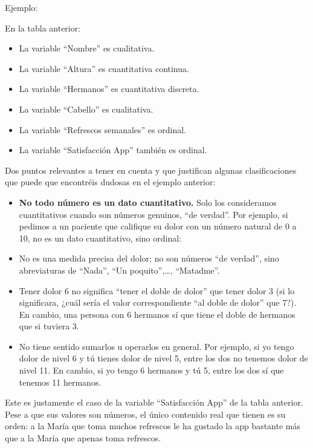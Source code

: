 \documentclass[
  spanish,
  letterpaper,
  DIV=11,
  numbers=noendperiod]{scrreprt}
\providecommand{\tightlist}{%
  \setlength{\itemsep}{0pt}\setlength{\parskip}{0pt}}
\begin{document}
Ejemplo:

En la tabla anterior:

\begin{itemize}
\tightlist
\item
  La variable ``Nombre'' es cualitativa.
\item
  La variable ``Altura'' es cuantitativa continua.
\item
  La variable ``Hermanos'' es cuantitativa discreta.
\item
  La variable ``Cabello'' es cualitativa.
\item
  La variable ``Refrescos semanales'' es ordinal.
\item
  La variable ``Satisfacción App'' también es ordinal.
\end{itemize}

Dos puntos relevantes a tener en cuenta y que justifican algunas
clasificaciones que puede que encontréis dudosas en el ejemplo anterior:

\begin{itemize}
\item
  \textbf{No todo número es un dato cuantitativo.} Solo los consideramos
  cuantitativos cuando son números genuinos, ``de verdad''. Por ejemplo,
  si pedimos a un paciente que califique su dolor con un número natural
  de 0 a 10, no es un dato cuantitativo, sino ordinal:
\item
  No es una medida precisa del dolor; no son números ``de verdad'', sino
  abreviaturas de ``Nada'', ``Un poquito'',\ldots, ``Matadme''.
\item
  Tener dolor 6 no significa ``tener el doble de dolor'' que tener dolor
  3 (si lo significara, ¿cuál sería el valor correspondiente ``al doble
  de dolor'' que 7?). En cambio, una persona con 6 hermanos sí que tiene
  el doble de hermanos que si tuviera 3.
\item
  No tiene sentido sumarlos u operarlos en general. Por ejemplo, si yo
  tengo dolor de nivel 6 y tú tienes dolor de nivel 5, entre los dos no
  tenemos dolor de nivel 11. En cambio, si yo tengo 6 hermanos y tú 5,
  entre los dos sí que tenemos 11 hermanos.
\end{itemize}

Este es justamente el caso de la variable ``Satisfacción App'' de la
tabla anterior. Pese a que sus valores son números, el único contenido
real que tienen es su orden: a la María que toma muchos refrescos le ha
gustado la app bastante más que a la María que apenas toma refrescos.
\end{document}
